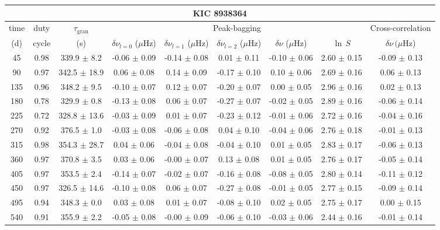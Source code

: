 \documentclass[twocolumn]{aastex61}%
\begin{document}
\begin{table*}[ht]\centering\fontsize{9.}{7.}\selectfont
\begin{tabular}{ccc|ccccc|c}
\multicolumn{9}{c}{KIC 8938364}\\ \hline\hline
time & duty & $\tau_\text{gran}$ &\multicolumn{5}{c|}{Peak-bagging}&Cross-correlation\\
(d)& cycle & (s)&$\delta\nu_{l=0}$ ($\mu$Hz) & $\delta\nu_{l=1}$ ($\mu$Hz) & $\delta\nu_{l=2}$ ($\mu$Hz) & $\delta\nu$ ($\mu$Hz)& $\ln\,S$ & $\delta\nu\,(\mu$Hz)\\\hline
45 & 0.98 & 339.9 $\pm$ 8.2 & -0.06 $\pm$ 0.09 & -0.14 $\pm$ 0.08 & 0.01 $\pm$ 0.11 & -0.10 $\pm$ 0.06 & 2.60 $\pm$ 0.15 & -0.09 $\pm$ 0.13\\
90 & 0.97 & 342.5 $\pm$ 18.9 & 0.06 $\pm$ 0.08 & 0.14 $\pm$ 0.09 & -0.17 $\pm$ 0.10 & 0.10 $\pm$ 0.06 & 2.69 $\pm$ 0.16 & 0.06 $\pm$ 0.13\\
135 & 0.96 & 348.2 $\pm$ 9.5 & -0.10 $\pm$ 0.07 & 0.12 $\pm$ 0.07 & -0.20 $\pm$ 0.07 & 0.00 $\pm$ 0.05 & 2.96 $\pm$ 0.16 & 0.02 $\pm$ 0.13\\
180 & 0.78 & 329.9 $\pm$ 0.8 & -0.13 $\pm$ 0.08 & 0.06 $\pm$ 0.07 & -0.27 $\pm$ 0.07 & -0.02 $\pm$ 0.05 & 2.89 $\pm$ 0.16 & -0.06 $\pm$ 0.14\\
225 & 0.72 & 328.8 $\pm$ 13.6 & -0.03 $\pm$ 0.09 & 0.01 $\pm$ 0.07 & -0.23 $\pm$ 0.12 & -0.01 $\pm$ 0.06 & 2.72 $\pm$ 0.16 & -0.04 $\pm$ 0.16\\
270 & 0.92 & 376.5 $\pm$ 1.0 & -0.03 $\pm$ 0.08 & -0.06 $\pm$ 0.08 & 0.04 $\pm$ 0.10 & -0.04 $\pm$ 0.06 & 2.76 $\pm$ 0.18 & -0.01 $\pm$ 0.13\\
315 & 0.98 & 354.3 $\pm$ 28.7 & 0.04 $\pm$ 0.06 & -0.04 $\pm$ 0.08 & -0.04 $\pm$ 0.10 & 0.01 $\pm$ 0.05 & 2.83 $\pm$ 0.17 & -0.06 $\pm$ 0.13\\
360 & 0.97 & 370.8 $\pm$ 3.5 & 0.03 $\pm$ 0.06 & -0.00 $\pm$ 0.07 & 0.13 $\pm$ 0.08 & 0.01 $\pm$ 0.05 & 2.76 $\pm$ 0.17 & -0.05 $\pm$ 0.14\\
405 & 0.97 & 353.5 $\pm$ 2.4 & -0.14 $\pm$ 0.07 & -0.02 $\pm$ 0.07 & -0.16 $\pm$ 0.08 & -0.08 $\pm$ 0.05 & 2.80 $\pm$ 0.14 & -0.11 $\pm$ 0.12\\
450 & 0.97 & 326.5 $\pm$ 14.6 & -0.10 $\pm$ 0.08 & 0.06 $\pm$ 0.07 & -0.27 $\pm$ 0.08 & -0.01 $\pm$ 0.05 & 2.77 $\pm$ 0.15 & -0.09 $\pm$ 0.14\\
495 & 0.94 & 348.3 $\pm$ 0.0 & 0.03 $\pm$ 0.08 & 0.01 $\pm$ 0.07 & -0.08 $\pm$ 0.10 & 0.02 $\pm$ 0.05 & 2.75 $\pm$ 0.17 & 0.00 $\pm$ 0.15\\
540 & 0.91 & 355.9 $\pm$ 2.2 & -0.05 $\pm$ 0.08 & -0.00 $\pm$ 0.09 & -0.06 $\pm$ 0.10 & -0.03 $\pm$ 0.06 & 2.44 $\pm$ 0.16 & -0.01 $\pm$ 0.14\\

\end{tabular}
\end{table*}
\end{document}
